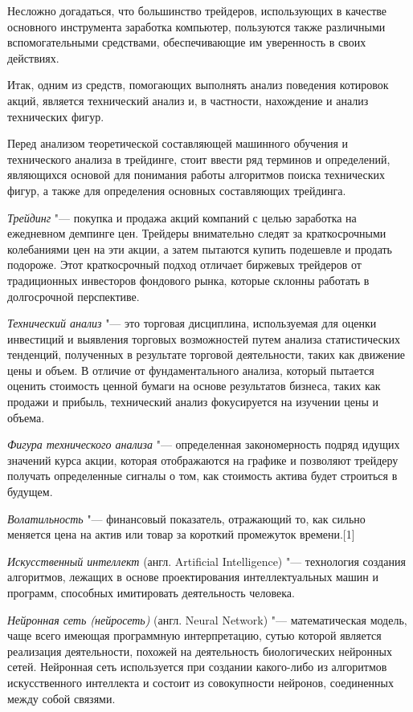 \documentclass[bachelor, och, coursework]{SCWorks}
\begin{document}
    Несложно догадаться, что большинство трейдеров, использующих в качестве
    основного инструмента заработка компьютер, пользуются также различными
    вспомогательными средствами, обеспечивающие им уверенность в своих
    действиях.

    Итак, одним из средств, помогающих выполнять анализ поведения котировок
    акций, является технический анализ и, в частности, нахождение и анализ
    технических фигур.

    Перед анализом теоретической составляющей машинного обучения и технического
    анализа в трейдинге, стоит ввести ряд терминов и определений, являющихся
    основой для понимания работы алгоритмов поиска технических фигур, а также
    для определения основных составляющих трейдинга.

    \textit{Трейдинг} "--- покупка и продажа акций компаний с целью заработка на
    ежедневном демпинге цен. Трейдеры внимательно следят за краткосрочными
    колебаниями цен на эти акции, а затем пытаются купить подешевле и продать
    подороже. Этот краткосрочный подход отличает биржевых трейдеров от
    традиционных инвесторов фондового рынка, которые склонны работать в
    долгосрочной перспективе.

    \textit{Технический анализ} "--- это торговая дисциплина, используемая для
    оценки инвестиций и выявления торговых возможностей путем анализа
    статистических тенденций, полученных в результате торговой деятельности,
    таких как движение цены и объем. В отличие от фундаментального анализа,
    который пытается оценить стоимость ценной бумаги на основе результатов
    бизнеса, таких как продажи и прибыль, технический анализ фокусируется на
    изучении цены и объема.

    \textit{Фигура технического анализа} "--- определенная закономерность подряд
    идущих значений курса акции, которая отображаются на графике и позволяют
    трейдеру получать определенные сигналы о том, как стоимость актива будет
    строиться в будущем.

    \textit{Волатильность} "--- финансовый показатель, отражающий то, как сильно
    меняется цена на актив или товар за короткий промежуток времени.[1]

    \textit{Искусственный интеллект} (англ. Artificial Intelligence) "---
    технология создания алгоритмов, лежащих в основе проектирования
    интеллектуальных машин и программ, способных имитировать деятельность
    человека.

    \textit{Нейронная сеть (нейросеть)} (англ. Neural Network) "---
    математическая модель, чаще всего имеющая программную интерпретацию, сутью
    которой является реализация деятельности, похожей на деятельность
    биологических нейронных сетей. Нейронная сеть используется при создании
    какого-либо из алгоритмов искусственного интеллекта и состоит из
    совокупности нейронов, соединенных между собой связями. 
\end{document}
